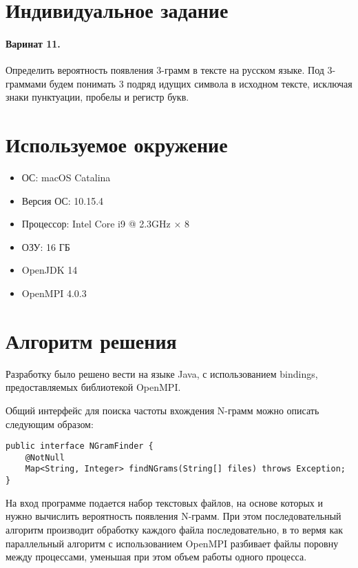 





\tableofcontents
\newpage

\section{Индивидуальное задание}

\paragraph{Варинат 11.} Определить вероятность появления 3-грамм в тексте на русском языке. Под 3-граммами будем понимать 3 подряд идущих символа в исходном тексте, исключая знаки пунктуации, пробелы и регистр букв.

\section{Используемое окружение}

\begin{itemize}
	\item ОС: macOS Catalina
	\item Версия ОС: 10.15.4
	\item Процессор: Intel Core i9 @ 2.3GHz × 8
	\item ОЗУ: 16 ГБ
	\item OpenJDK 14
	\item OpenMPI 4.0.3 
\end{itemize}

\section{Алгоритм решения}

Разработку было решено вести на языке Java, с использованием bindings, предоставляемых библиотекой OpenMPI.

Общий интерфейс для поиска частоты вхождения N-грамм можно описать следующим образом:

\begin{lstlisting}
public interface NGramFinder {
	@NotNull
	Map<String, Integer> findNGrams(String[] files) throws Exception;
}
\end{lstlisting}

На вход программе подается набор текстовых файлов, на основе которых и нужно вычислить вероятность появления N-грамм. При этом последовательный алгоритм производит обработку каждого файла последовательно, в то вермя как параллельный алгоритм с использованием OpenMPI разбивает файлы поровну между процессами, уменьшая при этом объем работы одного процесса.

